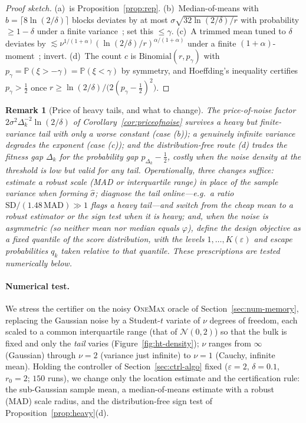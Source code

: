 \documentclass[11pt,a4paper]{article}
\newtheorem{remark}[theorem]{Remark}
\newcommand{\Prob}{\mathbb{P}}
\begin{document}
\begin{proof}[Proof sketch]
  (a)~is Proposition~\ref{prop:rep}.  (b)~Median-of-means with
  $b=\lceil8\ln(2/\delta)\rceil$ blocks deviates by at most
  $\sigma\sqrt{32\ln(2/\delta)/r}$ with probability $\ge1-\delta$ under a
  finite variance~\cite{LugosiMendelson2019}; set this $\le\gamma$.
  (c)~A trimmed mean tuned to $\delta$ deviates by
  $\lesssim\nu^{1/(1+\alpha)}(\ln(2/\delta)/r)^{\alpha/(1+\alpha)}$ under a
  finite $(1{+}\alpha)$-moment~\cite{LugosiMendelson2019}; invert.
  (d)~The count $c$ is $\mathrm{Binomial}(r,p_\gamma)$ with
  $p_\gamma=\Prob(\xi>-\gamma)=\Prob(\xi<\gamma)$ by symmetry, and
  Hoeffding's inequality certifies $p_\gamma>\tfrac12$ once
  $r\ge\ln(2/\delta)/\bigl(2(p_\gamma-\tfrac12)^2\bigr)$.
\end{proof}

\begin{remark}[Price of heavy tails, and what to change]\label{rem:heavy}
  The price-of-noise factor $2\sigma^2\Delta_k^{-2}\ln(2/\delta)$ of
  Corollary~\ref{cor:priceofnoise} survives a heavy but finite-variance tail
  with only a worse constant (case (b)); a genuinely infinite variance
  degrades the exponent (case (c)); and the distribution-free route (d)
  trades the fitness gap $\Delta_k$ for the probability gap
  $p_{\Delta_k}-\tfrac12$, costly when the noise density at the threshold
  is low but valid for any tail.  Operationally, three changes suffice:
  estimate a \emph{robust} scale (MAD or interquartile range) in place of
  the sample variance when forming $\widehat\sigma$; \emph{diagnose} the
  tail online---e.g.\ a ratio $\mathrm{SD}/(1.48\,\mathrm{MAD})\gg1$ flags
  a heavy tail---and switch from the cheap mean to a robust estimator or
  the sign test when it is heavy; and, when the noise is \emph{asymmetric}
  (so neither mean nor median equals $\varphi$), define the design objective
  as a fixed quantile of the score distribution, with the levels
  $1,\dots,K(\varepsilon)$ and escape probabilities $q_k$ taken relative to
  that quantile.  These prescriptions are tested numerically below.
\end{remark}

\paragraph{Numerical test.}
We stress the certifier on the noisy \textsc{OneMax} oracle of
Section~\ref{sec:num-memory}, replacing the Gaussian noise by a Student-$t$
variate of $\nu$ degrees of freedom, each scaled to a common interquartile
range (that of $\mathcal N(0,2)$) so that the bulk is fixed and only the
\emph{tail} varies (Figure~\ref{fig:ht-density}); $\nu$ ranges from $\infty$
(Gaussian) through $\nu=2$ (variance just infinite) to $\nu=1$ (Cauchy,
infinite mean).  Holding the controller of Section~\ref{sec:ctrl-algo} fixed
($\varepsilon=2$, $\delta=0.1$, $r_0=2$; $150$ runs), we change only the
location estimate and the certification rule: the sub-Gaussian sample mean,
a median-of-means estimate with a robust (MAD) scale radius, and the
distribution-free sign test of Proposition~\ref{prop:heavy}(d).
\end{document}
